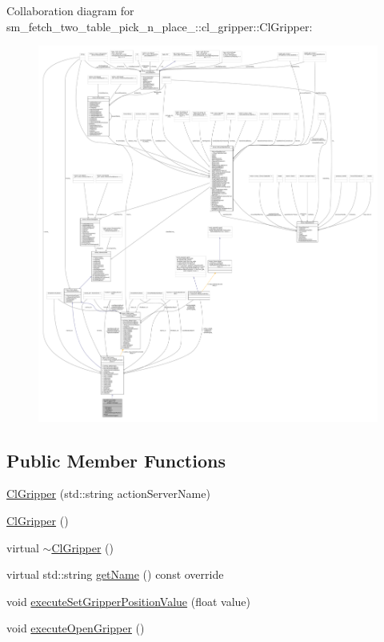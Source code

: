 Collaboration diagram for sm\+\_\+fetch\+\_\+two\+\_\+table\+\_\+pick\+\_\+n\+\_\+place\+\_\+:\+:cl\+\_\+gripper\+:\+:Cl\+Gripper\+:
\nopagebreak
\begin{figure}[H]
\begin{center}
\leavevmode
\includegraphics[width=350pt]{classsm__fetch__two__table__pick__n__place__1_1_1cl__gripper_1_1ClGripper__coll__graph}
\end{center}
\end{figure}
\subsection*{Public Member Functions}
\begin{DoxyCompactItemize}
\item 
\hyperlink{classsm__fetch__two__table__pick__n__place__1_1_1cl__gripper_1_1ClGripper_a2cf39969c4f1eb424803028661076d16}{Cl\+Gripper} (std\+::string action\+Server\+Name)
\item 
\hyperlink{classsm__fetch__two__table__pick__n__place__1_1_1cl__gripper_1_1ClGripper_a62e2ebe838b0ca9deefebacfcbbd1195}{Cl\+Gripper} ()
\item 
virtual \hyperlink{classsm__fetch__two__table__pick__n__place__1_1_1cl__gripper_1_1ClGripper_a0b56c442323eedf7aa6c721c39d21615}{$\sim$\+Cl\+Gripper} ()
\item 
virtual std\+::string \hyperlink{classsm__fetch__two__table__pick__n__place__1_1_1cl__gripper_1_1ClGripper_a2f6873bc11155e36252434cbbe43939e}{get\+Name} () const override
\item 
void \hyperlink{classsm__fetch__two__table__pick__n__place__1_1_1cl__gripper_1_1ClGripper_a0e0d2274fe711deb299e90dd371584b5}{execute\+Set\+Gripper\+Position\+Value} (float value)
\item 
void \hyperlink{classsm__fetch__two__table__pick__n__place__1_1_1cl__gripper_1_1ClGripper_a4be25e7913e55089bd7b5675cf1fc85b}{execute\+Open\+Gripper} ()
\end{DoxyCompactItemize}
